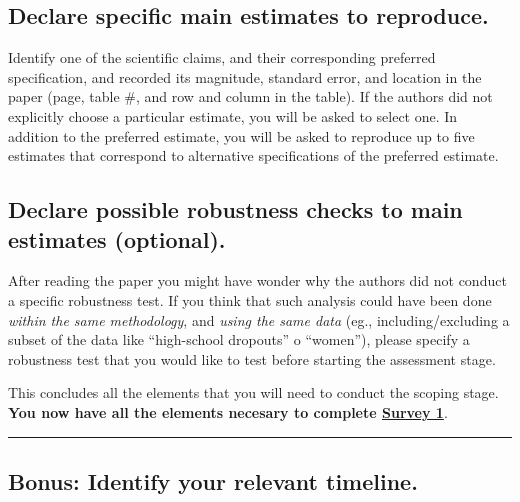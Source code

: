 \documentclass[]{book}
\begin{document}
\hypertarget{declare-specific-main-estimates-to-reproduce.}{%
\subsection*{Declare specific main estimates to reproduce.}\label{declare-specific-main-estimates-to-reproduce.}}

Identify one of the scientific claims, and their corresponding preferred specification, and recorded its magnitude, standard error, and location in the paper (page, table \#, and row and column in the table). If the authors did not explicitly choose a particular estimate, you will be asked to select one. In addition to the preferred estimate, you will be asked to reproduce up to five estimates that correspond to alternative specifications of the preferred estimate.

\hypertarget{declare-possible-robustness-checks-to-main-estimates-optional.}{%
\subsection*{Declare possible robustness checks to main estimates (optional).}\label{declare-possible-robustness-checks-to-main-estimates-optional.}}

After reading the paper you might have wonder why the authors did not conduct a specific robustness test. If you think that such analysis could have been done \emph{within the same methodology}, and \emph{using the same data} (eg., including/excluding a subset of the data like ``high-school dropouts'' o ``women''), please specify a robustness test that you would like to test before starting the assessment stage.

This concludes all the elements that you will need to conduct the scoping stage. \textbf{You now have all the elements necesary to complete \href{https://berkeley.qualtrics.com/jfe/form/SV_3UWe5xu3qjeh0c5}{Survey 1}}.

\begin{center}\rule{0.5\linewidth}{0.5pt}\end{center}

\hypertarget{bonus-identify-your-relevant-timeline.}{%
\subsection*{Bonus: Identify your relevant timeline.}\label{bonus-identify-your-relevant-timeline.}}
\end{document}
